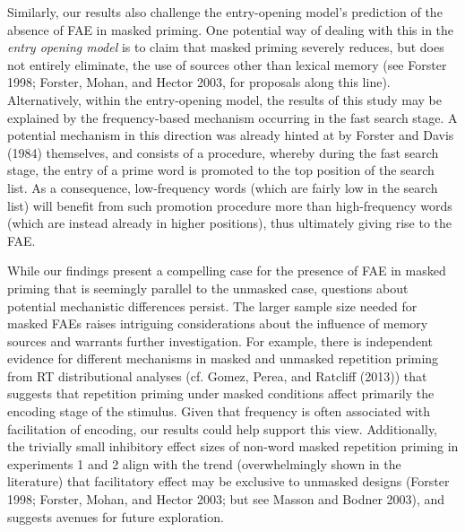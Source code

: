 \documentclass[
]{interact}
\begin{document}
Similarly, our results also challenge the entry-opening model's
prediction of the absence of FAE in masked priming. One potential way of
dealing with this in the \emph{entry opening model} is to claim that
masked priming severely reduces, but does not entirely eliminate, the
use of sources other than lexical memory (see Forster 1998; Forster,
Mohan, and Hector 2003, for proposals along this line). Alternatively,
within the entry-opening model, the results of this study may be
explained by the frequency-based mechanism occurring in the fast search
stage. A potential mechanism in this direction was already hinted at by
Forster and Davis (1984) themselves, and consists of a procedure,
whereby during the fast search stage, the entry of a prime word is
promoted to the top position of the search list. As a consequence,
low-frequency words (which are fairly low in the search list) will
benefit from such promotion procedure more than high-frequency words
(which are instead already in higher positions), thus ultimately giving
rise to the FAE.

While our findings present a compelling case for the presence of FAE in
masked priming that is seemingly parallel to the unmasked case,
questions about potential mechanistic differences persist. The larger
sample size needed for masked FAEs raises intriguing considerations
about the influence of memory sources and warrants further
investigation. For example, there is independent evidence for different
mechanisms in masked and unmasked repetition priming from RT
distributional analyses (cf. Gomez, Perea, and Ratcliff (2013)) that
suggests that repetition priming under masked conditions affect
primarily the encoding stage of the stimulus. Given that frequency is
often associated with facilitation of encoding, our results could help
support this view. Additionally, the trivially small inhibitory effect
sizes of non-word masked repetition priming in experiments 1 and 2 align
with the trend (overwhelmingly shown in the literature) that
facilitatory effect may be exclusive to unmasked designs (Forster 1998;
Forster, Mohan, and Hector 2003; but see Masson and Bodner 2003), and
suggests avenues for future exploration.
\end{document}
